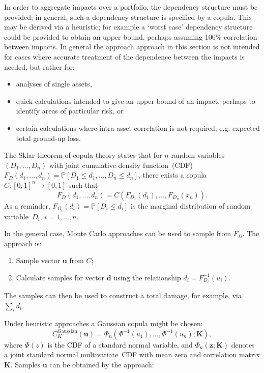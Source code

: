 \documentclass[a4paper,11pt]{extarticle} %
\begin{document}
 In order to aggregate impacts over a portfolio, the dependency structure must be provided; in general, such a dependency structure is specified by a copula\cite{Nelsen:2007}. This may be derived via a heuristic; for example a `worst case' dependency structure could be provided to obtain an upper bound, perhaps assuming 100\% correlation between impacts. In general the approach approach in this section is not intended for cases where accurate treatment of the dependence between the impacts is needed, but rather for:

\begin{itemize}
\item analyses of single assets,
\item quick calculations intended to give an upper bound of an impact, perhaps to identify areas of particular risk, or
\item certain calculations where intra-asset correlation is not required, e.g. expected total ground-up loss.
\end{itemize}

The Sklar theorem of copula theory states that for $n$ random variables~$(D_1, \dots, D_n)$ with joint cumulative density function~(CDF)~$F_D(d_1, \dots, d_n) = \mathbb{P}[D_1 \le d_1, \dots, D_n \le d_n]$, there exists a copula~\mbox{$C:[0,1]^n \rightarrow [0,1]$} such that
\begin{equation}
	\label{Eq:Copula}
	F_D(d_1, \dots, d_n) = C \left( F_{D_1}(d_1), \dots, F_{D_n}(x_n) \right).
\end{equation}
As a reminder, $F_{D_i}(d_i) = \mathbb{P}[D_i \le d_i]$ is the marginal distribution of random variable~$D_i$, \mbox{$i=1, \dots, n$}.

In the general case, Monte Carlo approaches can be used to sample from $F_D$. The approach is:

\begin{enumerate}[]
	\item Sample vector $\mathbf{u}$ from $C$;
	\item Calculate samples for vector $\mathbf{d}$ using the relationship $d_i = F_{D_i}^{-1}(u_i)$.
\end{enumerate}

The samples can then be used to construct a total damage, for example, via $\sum_i d_i$.

Under heuristic approaches a Gaussian copula might be chosen:
\begin{equation}
	\label{Eq:CopulaGaussian}
	C^{\text{Gaussian}}_K(\mathbf{u}) = \Phi_n(\Phi^{-1}(u_1), \dots, \Phi^{-1}(u_n);\mathbf{K}),
\end{equation}
where $\Phi(z)$ is the CDF of a standard normal variable, and $\Phi_n(\mathbf{z}; \mathbf{K})$ denotes a joint standard normal multivariate~CDF with mean zero and correlation matrix $\mathbf{K}$. Samples $\mathbf{u}$ can be obtained by the approach:
\end{document}
